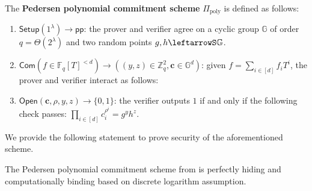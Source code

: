 \documentclass[../../book]{subfiles}
\begin{document}
\begin{definition}\label{def:pedersen-poly-commitment}
    The \textbf{Pedersen polynomial commitment scheme} $\Pi_{\text{poly}}$ is defined as follows:
    \begin{enumerate}
        \item $\mathsf{Setup}(1^{\lambda}) \to \mathsf{pp}$: the prover and verifier agree on a cyclic group $\mathbb{G}$ of order $q = \Theta(2^{\lambda})$ and two random points $g,h \leftarrowS \mathbb{G}$.
        \item $\mathsf{Com}(f \in \mathbb{F}_q[T]^{<d}) \to ((y,z) \in \mathbb{Z}_q^2, \mathbf{c} \in \mathbb{G}^d)$: given $f=\sum_{i \in [d]}f_iT^i$, the prover and verifier interact as follows:
        \item $\mathsf{Open}(\mathbf{c}, \rho, y, z) \to \{0,1\}$: the verifier outputs $1$ if and only if the following check passes: $\prod_{i \in [d]} c_i^{\rho^i} = g^yh^z$.
    \end{enumerate}
\end{definition}

We provide the following statement to prove security of the aforementioned scheme.

\begin{lemma}
    The Pedersen polynomial commitment scheme from  is perfectly hiding and computationally binding based on discrete logarithm assumption.
\end{lemma}
\end{document}

